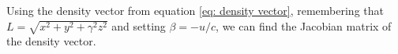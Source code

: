 





Using the density vector from equation \eqref{eq: density vector}, remembering that $ L=\sqrt{x^2+y^2+\gamma^2 z^2}$ and setting $\beta = - u/c$, we can find the Jacobian matrix of the density vector.

